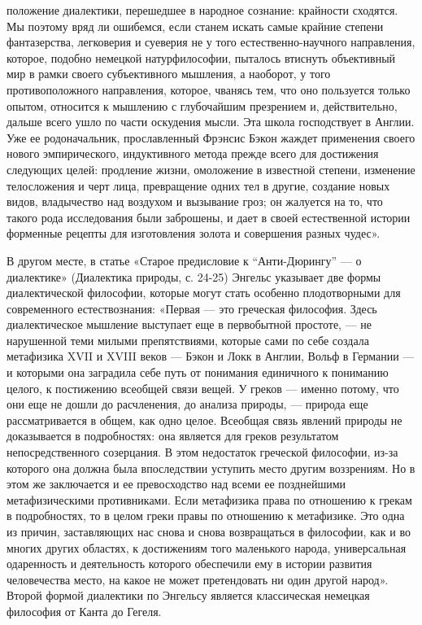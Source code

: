 положение диалектики, перешедшее в народное сознание: крайности
сходятся. Мы поэтому вряд ли ошибемся, если станем искать самые
крайние степени фантазерства, легковерия и суеверия не у того
естественно-научного направления, которое, подобно немецкой
натурфилософии, пыталось втиснуть объективный мир в рамки своего
субъективного мышления, а наоборот, у того противоположного
направления, которое, чванясь тем, что оно пользуется только опытом,
относится к мышлению с глубочайшим презрением и, действительно, дальше
всего ушло по части оскудения мысли. Эта школа господствует в Англии.
Уже ее родоначальник, прославленный Фрэнсис Бэкон жаждет применения
своего нового эмпирического, индуктивного метода прежде всего для
достижения следующих целей: продление жизни, омоложение в известной
степени, изменение телосложения и черт лица, превращение одних тел в
другие, создание новых видов, владычество над воздухом и вызывание
гроз; он жалуется на то, что такого рода исследования были заброшены,
и дает в своей естественной истории форменные рецепты для изготовления
золота и совершения разных чудес».

В другом месте, в статье «Старое предисловие к ``Анти-Дюрингу'' --- о
диалектике» (Диалектика природы, с. 24-25) Энгельс указывает две формы
диалектической философии, которые могут стать особенно плодотворными
для современного естествознания: «Первая --- это греческая философия.
Здесь диалектическое мышление выступает еще в первобытной простоте,
--- не нарушенной теми милыми препятствиями, которые сами по себе
создала метафизика XVII и XVIII веков --- Бэкон и Локк в Англии, Вольф
в Германии --- и которыми она заградила себе путь от понимания
единичного к пониманию целого, к постижению всеобщей связи вещей. У
греков --- именно потому, что они еще не дошли до расчленения, до
анализа природы, --- природа еще рассматривается в общем, как одно
целое. Всеобщая связь явлений природы не доказывается в подробностях:
она является для греков результатом непосредственного созерцания. В
этом недостаток греческой философии, из-за которого она должна была
впоследствии уступить место другим воззрениям. Но в этом же
заключается и ее превосходство над всеми ее позднейшими
метафизическими противниками. Если метафизика права по отношению к
грекам в подробностях, то в целом греки правы по отношению к
метафизике. Это одна из причин, заставляющих нас снова и снова
возвращаться в философии, как и во многих других областях, к
достижениям того маленького народа, универсальная одаренность и
деятельность которого обеспечили ему в истории развития человечества
место, на какое не может претендовать ни один другой народ». Второй
формой диалектики по Энгельсу является классическая немецкая философия
от Канта до Гегеля.

